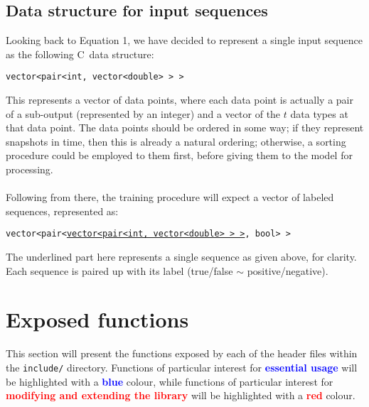 \documentclass[12pt]{article}
\def\CC{{C\nolinebreak[4]\hspace{-.05em}\raisebox{.4ex}{\tiny\bf ++}}}
\begin{document}
	\subsection{Data structure for input sequences}
	Looking back to Equation 1, we have decided to represent a single input sequence as the following \CC\ data structure:
	\begin{center}
		{\tt vector<pair<int, vector<double> > >}
	\end{center}
	This represents a vector of data points, where each data point is actually a pair of a sub-output (represented by an integer) and a vector of the $t$ data types at that data point. The data points should be ordered in some way; if they represent snapshots in time, then this is already a natural ordering; otherwise, a sorting procedure could be employed to them first, before giving them to the model for processing.\\ \\
	Following from there, the training procedure will expect a vector of labeled sequences, represented as:
	\begin{center}
		{\tt vector<pair<\underline{\ttfamily {}\selectfont vector<pair<int, vector<double> > >}, bool> >}
	\end{center}
	The underlined part here represents a single sequence as given above, for clarity. Each sequence is paired up with its label (true/false $\sim$ positive/negative).
	
	\section{Exposed functions}\label{sec:func}
	This section will present the functions exposed by each of the header files within the {\tt include/} directory. Functions of particular interest for {\bf \textcolor{blue}{essential usage}} will be highlighted with a {\bf \textcolor{blue}{blue}} colour, while functions of particular interest for {\bf \textcolor{red}{modifying and extending the library}} will be highlighted with a {\bf \textcolor{red}{red}} colour.
\end{document}
